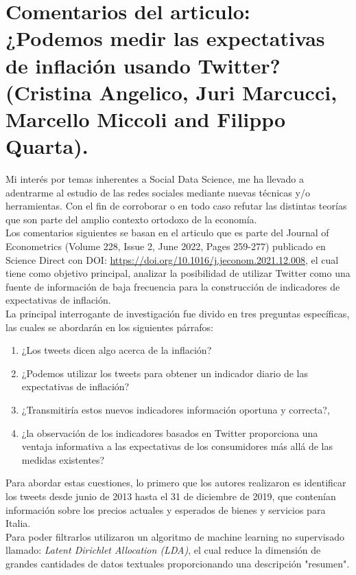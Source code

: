 \chapter*{Comentarios del articulo:\\ ¿Podemos medir las expectativas de inflación usando Twitter? \\\large(Cristina Angelico, Juri Marcucci, Marcello Miccoli and Filippo Quarta).}

Mi interés por temas inherentes a Social Data Science, me ha llevado a adentrarme al estudio de las redes sociales mediante nuevas técnicas y/o herramientas. Con el fin de corroborar o en todo caso refutar las distintas teorías que son parte del amplio contexto ortodoxo de la economía.\\

Los comentarios siguientes se basan en el articulo que es parte del Journal of Econometrics (Volume 228, Issue 2, June 2022, Pages 259-277) publicado en Science Direct con DOI: \url{https://doi.org/10.1016/j.jeconom.2021.12.008}, el cual tiene como objetivo principal, analizar la posibilidad de utilizar Twitter como una fuente de información de baja frecuencia para la construcción de indicadores de expectativas de inflación.\\

La principal interrogante de investigación fue divido en tres preguntas específicas, las cuales se abordarán en los siguientes párrafos:

\begin{enumerate}[1.]
    \item ¿Los tweets dicen algo acerca de la inflación?
    \item ¿Podemos utilizar los tweets para obtener un indicador diario de las expectativas de inflación?
    \item ¿Transmitiría estos nuevos indicadores información oportuna y correcta?, 
    \item ¿la observación de los indicadores basados en Twitter proporciona una ventaja informativa a las expectativas de los consumidores más allá de las medidas existentes?
\end{enumerate}

Para abordar estas cuestiones, lo primero que los autores realizaron es identificar los tweets desde junio de 2013 hasta el 31 de diciembre de 2019, que contenían información sobre los precios actuales y esperados de bienes y servicios para Italia. \\
Para poder filtrarlos utilizaron un algoritmo de machine learning no supervisado llamado: \textit{Latent Dirichlet Allocation (LDA)}, el cual reduce la dimensión de grandes cantidades de datos textuales proporcionando una descripción "resumen".\\


